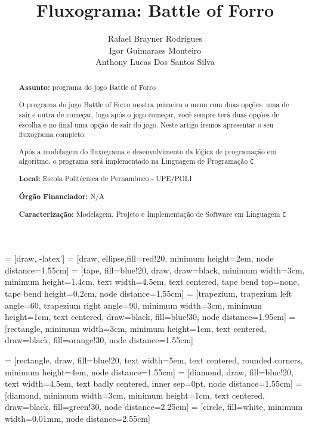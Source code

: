 \documentclass[a4paper,12pt]{article} %
\title{Fluxograma: Battle of Forro}
\author{Rafael Brayner Rodrigues \\ Igor Guimaraes Monteiro \\ Anthony Lucas Dos Santos Silva}
\begin{document}
\maketitle


 = [draw, -latex']
 = [draw, ellipse,fill=red!20, minimum height=2em, node distance=1.55cm]
 = [tape, fill=blue!20, draw, draw=black, minimum width=3cm, minimum height=1.4cm, text width=4.5em, text centered, tape bend top=none, tape bend height=0.2cm, node distance=1.55cm]
 = [trapezium, trapezium left angle=60, trapezium right angle=90, minimum width=3cm, minimum height=1cm, text centered, draw=black, fill=blue!30, node distance=1.95cm]
 = [rectangle, minimum width=3cm, minimum height=1cm, text centered, draw=black, fill=orange!30, node distance=1.55cm]

 = [rectangle, draw, fill=blue!20, text width=5em, text centered, rounded corners, minimum height=4em, node distance=1.55cm]
 = [diamond, draw, fill=blue!20, text width=4.5em, text badly centered, inner sep=0pt, node distance=1.55cm]
 = [diamond, minimum width=3cm, minimum height=1cm, text centered, draw=black, fill=green!30, node distance=2.25cm]
 = [circle, fill=white, minimum width=0.01mm, node distance=2.55cm]


\begin{abstract}

\textbf{Assunto:} programa do jogo Battle of Forro


O programa do jogo Battle of Forro mostra primeiro o menu com duas opções, uma de sair e outra de começar, logo após o jogo começar, você sempre terá duas opções de escolha e no final uma opção de sair do jogo. Neste artigo iremos apresentar o seu fluxograma completo.

Após a modelagem do fluxograma e desenvolvimento da lógica de programação em algoritmo,
o programa será implementado na Linguagem de Programação \texttt{C}


\textbf{Local:} Escola Politécnica de Pernambuco - UPE/POLI

\textbf{Órgão Financiador:} N/A

\textbf{Caracterização:} Modelagem, Projeto e Implementação de Software em Linguagem \texttt{C}


\end{abstract}
\end{document}
